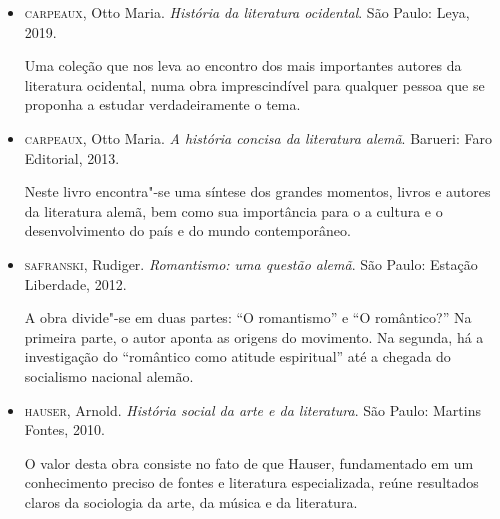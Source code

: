 \documentclass[12pt]{extarticle}
\begin{document}
\begin{itemize}
\item\textsc{carpeaux}, Otto Maria. \textit{História da literatura ocidental}. São
Paulo: Leya, 2019.

Uma coleção que nos leva ao encontro dos mais importantes autores da
literatura ocidental, numa obra imprescindível para qualquer pessoa que
se proponha a estudar verdadeiramente o tema.

\item\textsc{carpeaux}, Otto Maria. \textit{A história concisa da literatura alemã}.
Barueri: Faro Editorial, 2013.

Neste livro encontra"-se uma síntese dos grandes momentos, livros e
autores da literatura alemã, bem como sua importância para o a cultura e
o desenvolvimento do país e do mundo contemporâneo.

\item\textsc{safranski}, Rudiger. \textit{Romantismo: uma questão alemã}. São
Paulo: Estação Liberdade, 2012.

A obra divide"-se em duas partes: ``O romantismo'' e ``O romântico?'' Na
primeira parte, o autor aponta as origens do movimento. Na segunda, há a
investigação do ``romântico como atitude espiritual'' até a chegada do
socialismo nacional alemão.

\item\textsc{hauser}, Arnold. \textit{História social da arte e da literatura}. São
Paulo: Martins Fontes, 2010.

O valor desta obra consiste no fato de que Hauser, fundamentado em um
conhecimento preciso de fontes e literatura especializada, reúne
resultados claros da sociologia da arte, da música e da literatura.
\end{itemize}
\end{document}
